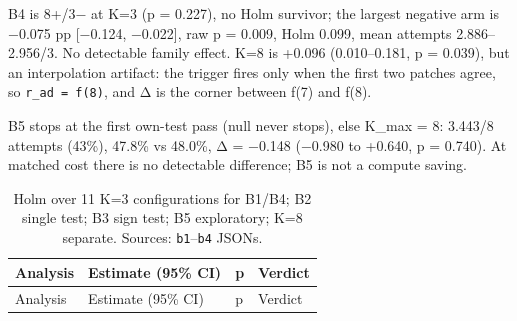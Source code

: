 \documentclass[
]{article}
\begin{document}
B4 is 8+/3− at K=3 (p = 0.227), no Holm survivor; the largest negative
arm is −0.075 pp {[}−0.124, −0.022{]}, raw p = 0.009, Holm 0.099, mean
attempts 2.886--2.956/3. No detectable family effect. K=8 is +0.096
(0.010--0.181, p = 0.039), but an interpolation artifact: the trigger
fires only when the first two patches agree, so \texttt{r\_ad\ =\ f(8)},
and Δ is the corner between f(7) and f(8).

B5 stops at the first own-test pass (null never stops), else K\_max = 8:
3.443/8 attempts (43\%), 47.8\% vs 48.0\%, Δ = −0.148 (−0.980 to +0.640,
p = 0.740). At matched cost there is no detectable difference; B5 is not
a compute saving.

\begin{longtable}[]{@{}
  >{\raggedright\arraybackslash}p{}
  >{\raggedright\arraybackslash}p{}
  >{\raggedright\arraybackslash}p{}
  >{\raggedright\arraybackslash}p{}@{}}
\caption{Holm over 11 K=3 configurations for B1/B4; B2 single test; B3
sign test; B5 exploratory; K=8 separate. Sources:
\texttt{b1}--\texttt{b4} JSONs.}\tabularnewline
\toprule\noalign{}
\begin{minipage}[b]{\linewidth}\raggedright
Analysis
\end{minipage} & \begin{minipage}[b]{\linewidth}\raggedright
Estimate (95\% CI)
\end{minipage} & \begin{minipage}[b]{\linewidth}\raggedright
p
\end{minipage} & \begin{minipage}[b]{\linewidth}\raggedright
Verdict
\end{minipage} \\
\midrule\noalign{}
\endfirsthead
\toprule\noalign{}
\begin{minipage}[b]{\linewidth}\raggedright
Analysis
\end{minipage} & \begin{minipage}[b]{\linewidth}\raggedright
Estimate (95\% CI)
\end{minipage} & \begin{minipage}[b]{\linewidth}\raggedright
p
\end{minipage} & \begin{minipage}[b]{\linewidth}\raggedright
Verdict
\end{minipage} \\

\end{longtable}
\end{document}
